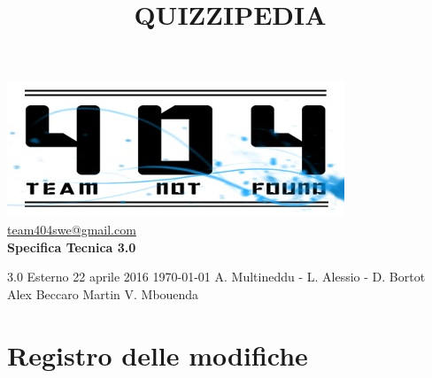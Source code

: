 \documentclass[a4paper,11pt]{article}
\title{\textbf{{\fontsize{8mm}{5mm}\selectfont QUIZZIPEDIA}}}
\date{}
\author{}
\begin{document}
	\maketitle
	\thispagestyle{empty}
	\begin{center}	
	\includegraphics{../team_not_found.jpg}\\
	\fontsize{5mm}{3mm}\url{team404swe@gmail.com}\\
	
	\vspace{50mm}
	\textbf{Specifica Tecnica 3.0}
	\end{center}
			{3.0} 							%
			{Esterno} 						%
			{22 aprile 2016} 				%
			{\today} 						%
			{A. Multineddu - L. Alessio - D. Bortot}	%
			{Alex Beccaro } 			%
			{Martin V. Mbouenda} 				%
	\newpage
	\thispagestyle{empty}
	\null  

	\newpage
	\newpage
	\fancyfoot[R]{\thepage}
	
	\hspace{30 mm}
	\section*{Registro delle modifiche}
	
	\beginregistro
	
\end{document}
